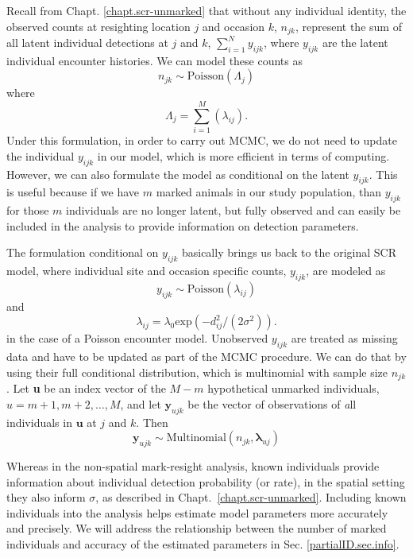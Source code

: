 Recall from Chapt. \ref{chapt.scr-unmarked} that without any
individual identity, the observed counts at resighting location $j$
and occasion $k$, $n_{jk}$, represent the sum of all latent individual
detections at $j$ and $k$, $\displaystyle\sum\limits_{i=1}^{N}
y_{ijk}$, where $y_{ijk}$ are the latent individual encounter
histories.  We can model these counts as
\[
n_{jk} \sim \mbox{Poisson}( \Lambda_{j} )
\]
where
\[
\Lambda_{j} = \sum_{i=1}^{M}( \lambda_{ij} ).
\]
Under this formulation, in order to carry out MCMC, we do not need to
update the individual $y_{ijk}$ in our model, which is more efficient
in terms of computing. However, we can also formulate the model as
conditional on the latent $y_{ijk}$. This is useful because if we have
$m$ marked animals in our study population, than $y_{ijk}$ for those
$m$ individuals are no longer latent, but fully observed and can
easily be included in the analysis to provide information on detection
parameters.

The formulation conditional on $y_{ijk}$ basically brings us back to
the original SCR model, where individual site and occasion specific
counts, $y_{ijk}$, are modeled as
\[
y_{ijk} \sim \mbox{Poisson}(\lambda_{ij})
\]
and
\[
\lambda_{ij} = \lambda_0  \mbox{exp}(-d_{ij}^2/(2 \sigma^2)).
\]
in the case of a Poisson encounter model.
Unobserved $y_{ijk}$ are treated as missing data and have to be
updated as part of the MCMC procedure. We can do that by using their
full conditional distribution, which is multinomial with sample size
$n_{jk}$.
Let \textbf{u} be an index vector of the $M-m$ hypothetical
unmarked individuals, $u=m+1, m+2, \ldots, M$, and let $\mathbf{y}_{ujk}$ be the vector of observations of {\emph all} individuals in $\mathbf{u}$ at $j$ and $k$. Then
\[
\mathbf{y}_{ujk} \sim \mbox{Multinomial} (n_{jk}, \mathbf{\lambda}_{uj})
\]

Whereas in the non-spatial mark-resight analysis, known individuals
provide information about individual detection probability (or rate),
in the spatial setting they also inform $\sigma$, as described in
Chapt.~\ref{chapt.scr-unmarked}. Including known individuals into the
analysis helps estimate model parameters more accurately and
precisely. We will address the relationship between the number of
marked individuals and accuracy of the estimated parameters in
Sec. \ref{partialID.sec.info}.


